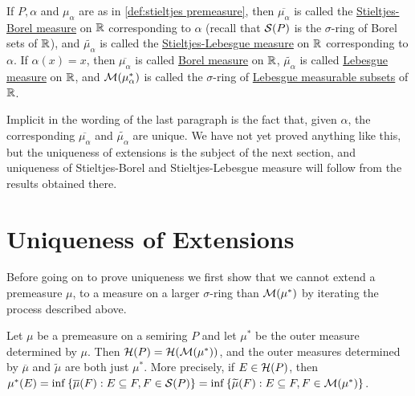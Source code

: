\begin{definition}
If $P, \alpha$ and $\mu_\alpha$ are as in \ref{def:stieltjes premeasure}, then $\overline{\mu_\alpha}$ is called the \underline{Stieltjes-Borel measure} on $\mathbb{R}$ corresponding to $\alpha$ (recall that ${\cal S}(P)$ is the $\sigma$-ring of Borel sets of $\mathbb{R}$), and $\widetilde{\mu_\alpha}$ is called the \underline{Stieltjes-Lebesgue measure} on $\mathbb{R}$ corresponding to $\alpha$. If $\alpha(x)=x$, then $\overline{\mu_\alpha}$ is called \underline{Borel measure} on $\mathbb{R}$, $\widetilde{\mu_\alpha}$ is called \underline{Lebesgue measure} on $\mathbb{R}$, and ${\cal M}(\mu_\alpha^*)$ is called the $\sigma$-ring of \underline{Lebesgue measurable subsets} of $\mathbb{R}$.
\end{definition}

Implicit in the wording of the last paragraph is the fact that, given $\alpha$, the corresponding $\overline{\mu_\alpha}$ and $\widetilde{\mu_\alpha}$ are unique. We have not yet proved anything like this, but the uniqueness of extensions is the subject of the next section, and uniqueness of Stieltjes-Borel and Stieltjes-Lebesgue measure will follow from the results obtained there.

\section{Uniqueness of Extensions}

Before going on to prove uniqueness we first show that we cannot extend a premeasure $\mu$, to a measure on a larger $\sigma$-ring than ${\cal M}(\mu^*)$ by iterating the process described above.

\begin{proposition}
\label{prop:repeated outer measure}
Let $\mu$ be a premeasure on a semiring $P$ and let $\mu^*$ be the outer measure determined by $\mu$. Then ${\cal H}(P)={\cal H}({\cal M}(\mu^*))$, and the outer measures determined by $\overline{\mu}$ and $\widetilde{\mu}$ are both just $\mu^*$. More precisely, if $E \in {\cal H}(P)$, then $\mu^*(E)=\inf \left\{\overline{\mu}(F):E\subseteq F,F\in {\cal S}(P)\right\}=\allowbreak\inf \left\{\widetilde{\mu}(F):E\subseteq F,F\in {\cal M}(\mu^*)\right\}$.
\end{proposition}


